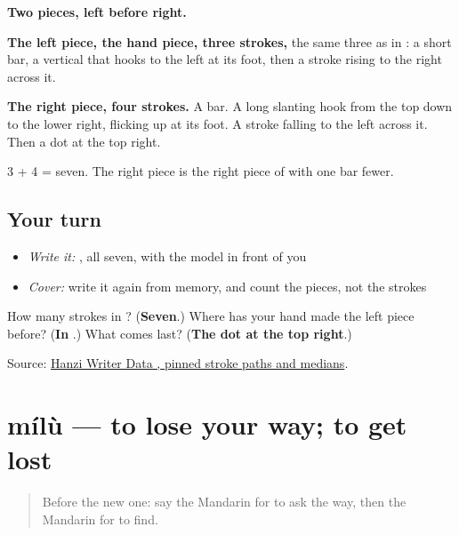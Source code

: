 \begin{quote}
\end{quote}

\textbf{Two pieces, left before right.}

\textbf{The left piece, the hand piece, three strokes,} the same three as in : a short bar, a vertical that hooks to the left at its foot, then a stroke rising to the right across it.

\textbf{The right piece, four strokes.} A bar. A long slanting hook from the top down to the lower right, flicking up at its foot. A stroke falling to the left across it. Then a dot at the top right.

3 + 4 = seven. The right piece is the right piece of  with one bar fewer.

\subsection*{Your turn}
\begin{itemize}
\raggedright
  \item \emph{Write it:} , all seven, with the model in front of you
  \item \emph{Cover:} write it again from memory, and count the pieces, not the strokes
\end{itemize}

\begin{tcolorbox}[breakable,colback=teal!4,colframe=teal!35!black,title={Before you move on}]
How many strokes in ? (\textbf{Seven}.) Where has your hand made the left piece before? (\textbf{In }.) What comes last? (\textbf{The dot at the top right}.)

Source: \href{https://raw.githubusercontent.com/chanind/hanzi-writer-data/68d10a4b21150cae5e1ebbd223eed289cf32d90c/data/\%E6\%89\%BE.json}{Hanzi Writer Data , pinned stroke paths and medians}.
\end{tcolorbox}
\section[mílù]{mílù — to lose your way; to get lost}

\label{lesson:ZH-C197-milu}



\begin{quote}
Before the new one: say the Mandarin for to ask the way, then the Mandarin for to find.
\end{quote}

